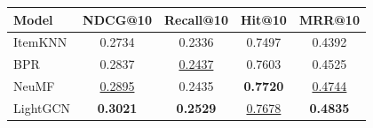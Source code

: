 \begin{tabular}{|l|c|c|c|c|}
\hline
\textbf{Model} & \textbf{NDCG@10} & \textbf{Recall@10} & \textbf{Hit@10} & \textbf{MRR@10} \\ \hline
ItemKNN & 0.2734 & 0.2336 & 0.7497 & 0.4392 \\ \hline
BPR & 0.2837 & \underline{0.2437} & 0.7603 & 0.4525 \\ \hline
NeuMF & \underline{0.2895} & 0.2435 & \textbf{0.7720} & \underline{0.4744} \\ \hline
LightGCN & \textbf{0.3021} & \textbf{0.2529} & \underline{0.7678} & \textbf{0.4835} \\ \hline
\end{tabular}
